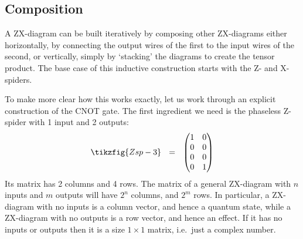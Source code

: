 \documentclass[a4paper,onecolumn,superscriptaddress,11pt,%
				unpublished,%
				allowfontchageintitle,%
				]{quantumarticle}
\begin{document}
\subsection{Composition}\label{sec:composition}

A ZX-diagram can be built iteratively by composing other ZX-diagrams either horizontally, by connecting the output wires of the first to the input wires of the second, or vertically, simply by `stacking' the diagrams to create the tensor product. The base case of this inductive construction starts with the Z- and X-spiders.

To make more clear how this works exactly, let us work through an explicit construction of the CNOT gate.
The first ingredient we need is the phaseless Z-spider with 1 input and 2 outputs:
\begin{equation}\label{eq:Zsp-3}
\tikzfig{Zsp-3}\ \ = \ \ \begin{pmatrix}1&0\\0&0\\0&0\\0&1\end{pmatrix}
\end{equation}
Its matrix has 2 columns and 4 rows. The matrix of a general ZX-diagram with $n$ inputs and $m$ outputs will have $2^n$ columns, and $2^m$ rows.
In particular, a ZX-diagram with no inputs is a column vector, and hence a quantum state, while a ZX-diagram with no outputs is a row vector, and hence an effect. If it has no inputs or outputs then it is a size $1\times 1$ matrix, i.e.~just a complex number.
\end{document}
